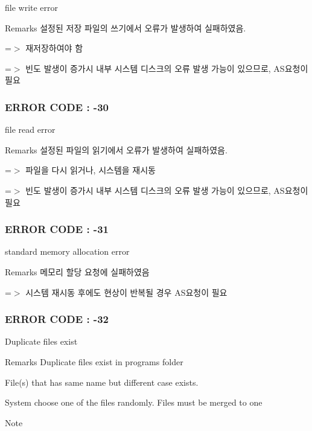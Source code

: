 file write error \begin{DoxyRemark}{Remarks}
설정된 저장 파일의 쓰기에서 오류가 발생하여 실패하였음. \par
 =$>$ 재저장하여야 함 \par
 =$>$ 빈도 발생이 증가시 내부 시스템 디스크의 오류 발생 가능이 있으므로, A\-S요청이 필요
\end{DoxyRemark}


 \subsubsection*{E\-R\-R\-O\-R C\-O\-D\-E \-: -\/30 }

file read error \begin{DoxyRemark}{Remarks}
설정된 파일의 읽기에서 오류가 발생하여 실패하였음. \par
 =$>$ 파일을 다시 읽거나, 시스템을 재시동 \par
 =$>$ 빈도 발생이 증가시 내부 시스템 디스크의 오류 발생 가능이 있으므로, A\-S요청이 필요
\end{DoxyRemark}


 \subsubsection*{E\-R\-R\-O\-R C\-O\-D\-E \-: -\/31 }

standard memory allocation error \par
 \begin{DoxyRemark}{Remarks}
메모리 할당 요청에 실패하였음 \par
 =$>$ 시스템 재시동 후에도 현상이 반복될 경우 A\-S요청이 필요
\end{DoxyRemark}


 \subsubsection*{E\-R\-R\-O\-R C\-O\-D\-E \-: -\/32 }

Duplicate files exist \begin{DoxyRemark}{Remarks}
Duplicate files exist in programs folder \par
 File(s) that has same name but different case exists. \par
 System choose one of the files randomly. Files must be merged to one 
\end{DoxyRemark}
\begin{DoxyNote}{Note}

\end{DoxyNote}


